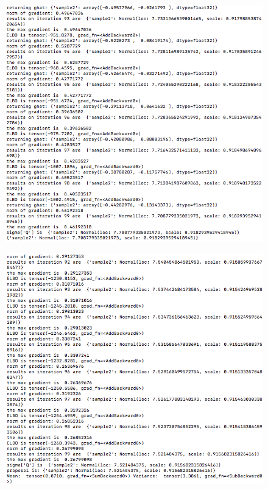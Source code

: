 \documentclass[12pt]{article}%
\theoremstyle{definition}
\begin{document}
	\begin{figure}[h]
	\includegraphics[scale=0.6]{p1_variational}
	\end{figure}
	
	\begin{figure}[h]
	\includegraphics[scale=0.7]{program1}
	\end{figure}
	
\end{document}
